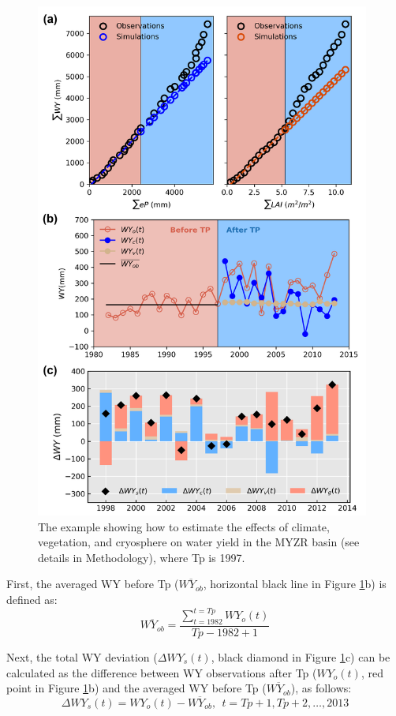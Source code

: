 \documentclass[hess, manuscript]{copernicus}
\begin{document}
\begin{figure}[ht]
    \includegraphics[width=11cm]{02-figures/example_DMC.png}
    \caption
    {The example showing how to estimate the effects of climate, vegetation, and cryosphere on water yield in the MYZR basin (see details in Methodology), where Tp is 1997.}
    \label{fig:example_DMC}
\end{figure}

First, the averaged WY before Tp ($\overline{WY_{ob}}$, horizontal black line in Figure \ref{fig:example_DMC}b) is defined as:
\begin{equation}
    \overline{WY_{ob}} = \frac{\sum_{t=1982}^{t=Tp}WY_o(t)} {Tp-1982+1}
\end{equation}

Next, the total WY deviation ($\Delta WY_s(t)$, black diamond in Figure \ref{fig:example_DMC}c) can be calculated as the difference between WY observations after Tp ($WY_o(t)$, red point in Figure \ref{fig:example_DMC}b) and the averaged WY before Tp ($\overline{WY_{ob}}$), as follows:
\begin{equation} 
    \Delta WY_s(t)=WY_o(t)-\overline{WY_{ob}}, \ \  t=Tp+1, Tp+2, \ldots, 2013
\end{equation}
\end{document}
